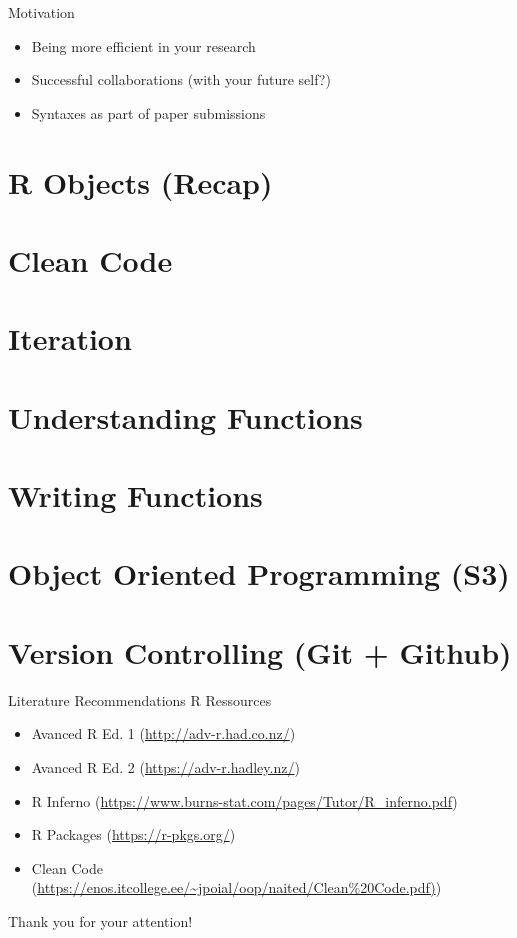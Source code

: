\documentclass[xcolor=table]{beamer}\usepackage[]{graphicx}\usepackage[]{color}
\begin{document}
\begin{frame}{Motivation}
	\begin{itemize}
			\item Being more efficient in your research
			\item Successful collaborations (with your future self?)
			\item Syntaxes as part of paper submissions
			
	\end{itemize}
\end{frame}

\section{R Objects (Recap)}

\section{Clean Code}

\section{Iteration}

\section{Understanding Functions}

\section{Writing Functions}

\section{Object Oriented Programming (S3)}

\section{Version Controlling (Git + Github)}


\begin{frame}{Literature Recommendations}
R Ressources
\begin{itemize}
\item Avanced R Ed. 1 (\url{http://adv-r.had.co.nz/})
\item Avanced R Ed. 2 (\url{https://adv-r.hadley.nz/})
\item R Inferno (\url{https://www.burns-stat.com/pages/Tutor/R_inferno.pdf})
\item R Packages (\url{https://r-pkgs.org/})
\item Clean Code (\url{https://enos.itcollege.ee/~jpoial/oop/naited/Clean\%20Code.pdf)})
\end{itemize}

\end{frame}

\begin{frame}[plain]

\begin{center}
\Large Thank you for your attention!

\end{center}

\end{frame}
\end{document}
